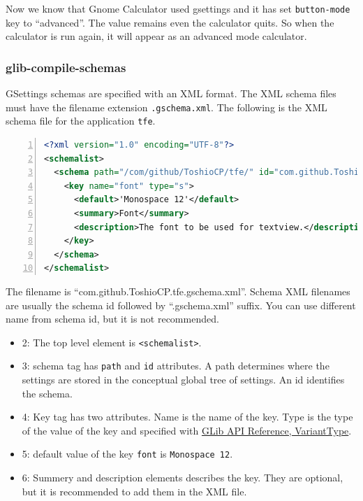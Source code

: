 Now we know that Gnome Calculator used gsettings and it has set
\passthrough{\lstinline!button-mode!} key to ``advanced''. The value
remains even the calculator quits. So when the calculator is run again,
it will appear as an advanced mode calculator.

\hypertarget{glib-compile-schemas}{%
\subsubsection{glib-compile-schemas}\label{glib-compile-schemas}}

GSettings schemas are specified with an XML format. The XML schema files
must have the filename extension \passthrough{\lstinline!.gschema.xml!}.
The following is the XML schema file for the application
\passthrough{\lstinline!tfe!}.

\begin{lstlisting}[language=XML, numbers=left]
<?xml version="1.0" encoding="UTF-8"?>
<schemalist>
  <schema path="/com/github/ToshioCP/tfe/" id="com.github.ToshioCP.tfe">
    <key name="font" type="s">
      <default>'Monospace 12'</default>
      <summary>Font</summary>
      <description>The font to be used for textview.</description>
    </key>
  </schema>
</schemalist>
\end{lstlisting}

The filename is ``com.github.ToshioCP.tfe.gschema.xml''. Schema XML
filenames are usually the schema id followed by ``.gschema.xml'' suffix.
You can use different name from schema id, but it is not recommended.

\begin{itemize}
\tightlist
\item
  2: The top level element is \passthrough{\lstinline!<schemalist>!}.
\item
  3: schema tag has \passthrough{\lstinline!path!} and
  \passthrough{\lstinline!id!} attributes. A path determines where the
  settings are stored in the conceptual global tree of settings. An id
  identifies the schema.
\item
  4: Key tag has two attributes. Name is the name of the key. Type is
  the type of the value of the key and specified with
  \href{https://docs.gtk.org/glib/struct.VariantType.html}{GLib API
  Reference, VariantType}.
\item
  5: default value of the key \passthrough{\lstinline!font!} is
  \passthrough{\lstinline!Monospace 12!}.
\item
  6: Summery and description elements describes the key. They are
  optional, but it is recommended to add them in the XML file.
\end{itemize}

